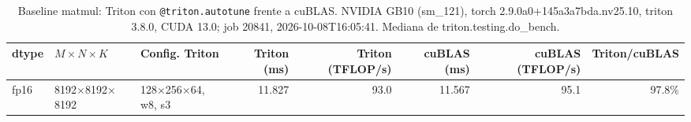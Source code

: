 \begin{table}[htbp]
  \centering\small
  \begin{tabular}{lllrrrrr}
    \toprule
    dtype & $M \times N \times K$ & Config. Triton & Triton (ms) & Triton (TFLOP/s) & cuBLAS (ms) & cuBLAS (TFLOP/s) & Triton/cuBLAS \\
    \midrule
    fp16 & 8192$\times$8192$\times$8192 & 128$\times$256$\times$64, w8, s3 & 11.827 & 93.0 & 11.567 & 95.1 & 97.8\% \\
    \bottomrule
  \end{tabular}
  \caption{Baseline matmul: Triton con \texttt{@triton.autotune} frente a cuBLAS. NVIDIA GB10 (sm\_121), torch 2.9.0a0+145a3a7bda.nv25.10, triton 3.8.0, CUDA 13.0; job 20841, 2026-10-08T16:05:41. Mediana de triton.testing.do\_bench.}
  \label{tab:hennessy-frio-baseline-matmul}
\end{table}
